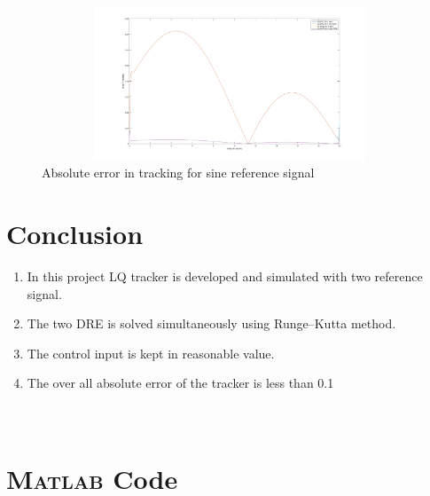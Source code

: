 \documentclass[12pt]{article}
\begin{document}
\vspace{2cm}
\begin{figure}[h]
	\centering
	\includegraphics[height=1.8in,width=5.5in]{sin_error.png}
	\caption{Absolute error in tracking for sine reference signal}
	\label{fig:sin_error}
\end{figure}
\newpage

\section{Conclusion}\label{Conclusion}

\begin{enumerate}
	\item In this project LQ tracker is developed and simulated with two reference signal.
	\item The two DRE is solved simultaneously using Runge–Kutta method.
	\item The control input is kept in reasonable value.
	\item The over all absolute error of the tracker is less than 0.1
	
\end{enumerate}

\appendix
\section{\\ \textsc{Matlab} Code}



\end{document}
